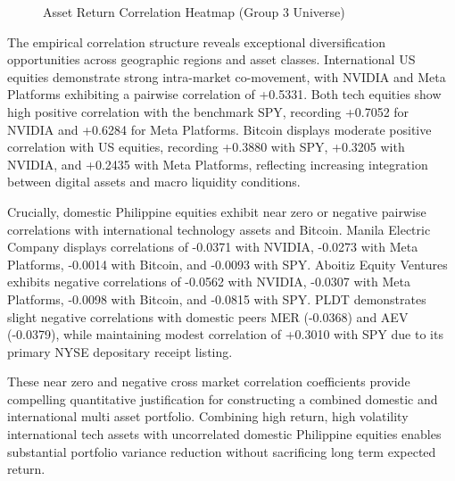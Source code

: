 

\begin{figure}[H]
  \centering
  \caption{Asset Return Correlation Heatmap (Group 3 Universe)}
  \label{fig:correlation_heatmap}
\end{figure}

The empirical correlation structure reveals exceptional diversification opportunities across geographic regions and asset classes. International US equities demonstrate strong intra-market co-movement, with NVIDIA and Meta Platforms exhibiting a pairwise correlation of +0.5331. Both tech equities show high positive correlation with the benchmark SPY, recording +0.7052 for NVIDIA and +0.6284 for Meta Platforms. Bitcoin displays moderate positive correlation with US equities, recording +0.3880 with SPY, +0.3205 with NVIDIA, and +0.2435 with Meta Platforms, reflecting increasing integration between digital assets and macro liquidity conditions.

Crucially, domestic Philippine equities exhibit near zero or negative pairwise correlations with international technology assets and Bitcoin. Manila Electric Company displays correlations of -0.0371 with NVIDIA, -0.0273 with Meta Platforms, -0.0014 with Bitcoin, and -0.0093 with SPY. Aboitiz Equity Ventures exhibits negative correlations of -0.0562 with NVIDIA, -0.0307 with Meta Platforms, -0.0098 with Bitcoin, and -0.0815 with SPY. PLDT demonstrates slight negative correlations with domestic peers MER (-0.0368) and AEV (-0.0379), while maintaining modest correlation of +0.3010 with SPY due to its primary NYSE depositary receipt listing.

These near zero and negative cross market correlation coefficients provide compelling quantitative justification for constructing a combined domestic and international multi asset portfolio. Combining high return, high volatility international tech assets with uncorrelated domestic Philippine equities enables substantial portfolio variance reduction without sacrificing long term expected return.
